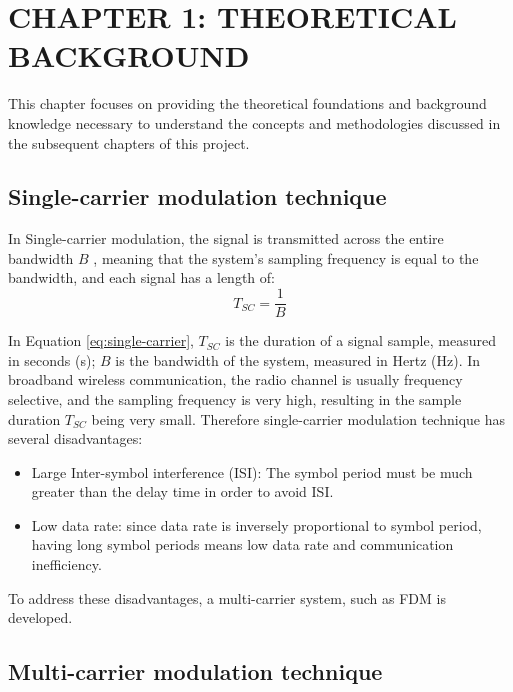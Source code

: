 \section*{CHAPTER 1: THEORETICAL BACKGROUND}
\setcounter{section}{1}
\setcounter{subsection}{0}
\setcounter{figure}{0}
\setcounter{table}{0}

This chapter focuses on providing the theoretical foundations and background knowledge necessary to understand the concepts and methodologies discussed in the subsequent chapters of this project.

\subsection{Single-carrier modulation technique}
In Single-carrier modulation, the signal is transmitted across the entire bandwidth $B$ \cite{OFDM2006}, meaning that the system's sampling frequency is equal to the bandwidth, and each signal has a length of:
\begin{equation}
    T_{SC} = \frac{1}{B}
    \label{eq:single-carrier}
\end{equation}

In Equation \ref{eq:single-carrier}, $T_{SC}$ is the duration of a signal sample, measured in seconds (s); $B$ is the bandwidth of the system, measured in Hertz (Hz). In broadband wireless communication, the radio channel is usually frequency selective, and the sampling frequency is very high, resulting in the sample duration $T_{SC}$ being very small. Therefore single-carrier modulation technique has several disadvantages:

\begin{itemize}
    \item Large Inter-symbol interference (ISI): The symbol period must be much greater than the delay time in order to avoid ISI.
    \item Low data rate: since data rate is inversely proportional to symbol period, having long symbol periods means low data rate and communication inefficiency.
\end{itemize}

To address these disadvantages, a multi-carrier system, such as FDM is developed.

\subsection{Multi-carrier modulation technique}

